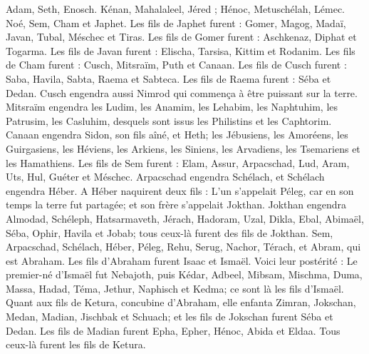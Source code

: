 \begin{multicols}{2}
\VerseOne{}Adam, Seth, Enosch.
Kénan, Mahalaleel, Jéred ;
Hénoc, Metuschélah, Lémec.
Noé, Sem, Cham et Japhet.
Les fils de Japhet furent : Gomer, Magog, Madaï, Javan, Tubal, Méschec et Tiras.
Les fils de Gomer furent : Aschkenaz, Diphat et Togarma.
Les fils de Javan furent : Elischa, Tarsisa, Kittim et Rodanim.
Les fils de Cham furent : Cusch, Mitsraïm, Puth et Canaan.
Les fils de Cusch furent  : Saba, Havila, Sabta, Raema et Sabteca. Les fils de Raema furent : Séba et Dedan.
Cusch engendra aussi Nimrod qui commença à être puissant sur la terre.
Mitsraïm engendra les Ludim, les Anamim, les Lehabim, les Naphtuhim,
les Patrusim, les Casluhim, desquels sont issus les Philistins et les Caphtorim.
Canaan engendra Sidon, son fils aîné, et Heth;
les Jébusiens, les Amoréens, les Guirgasiens,
les Héviens, les Arkiens, les Siniens,
les Arvadiens, les Tsemariens et les Hamathiens.
Les fils de Sem furent : Elam, Assur, Arpacschad, Lud, Aram, Uts, Hul, Guéter et Méschec.
Arpacschad engendra Schélach, et Schélach engendra Héber.
A Héber naquirent deux fils : L'un s'appelait Péleg, car en son temps la terre fut partagée; et son frère s’appelait Jokthan.
Jokthan engendra Almodad, Schéleph, Hatsarmaveth, Jérach,
Hadoram, Uzal, Dikla,
Ebal, Abimaël, Séba,
Ophir, Havila et Jobab; tous ceux-là furent des fils de Jokthan.
Sem, Arpacschad, Schélach,
Héber, Péleg, Rehu,
Serug, Nachor, Térach,
et Abram, qui est Abraham.
Les fils d’Abraham furent  Isaac et Ismaël.
Voici leur postérité : Le premier-né d'Ismaël fut Nebajoth, puis Kédar, Adbeel, Mibsam,
Mischma, Duma, Massa, Hadad, Téma,
Jethur, Naphisch et Kedma; ce sont là les fils d'Ismaël.
Quant aux fils de Ketura, concubine d'Abraham, elle enfanta Zimran, Jokschan, Medan, Madian, Jischbak et Schuach; et les fils de Jokschan furent Séba et Dedan.
Les fils de Madian furent  Epha, Epher, Hénoc, Abida et Eldaa. Tous ceux-là furent les fils de Ketura.

\end{multicols}

